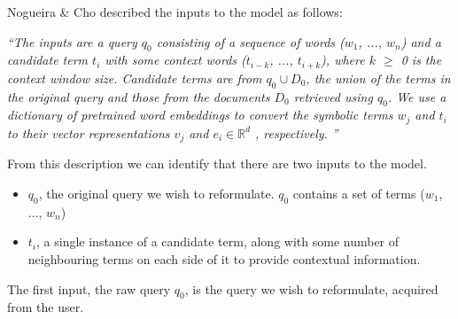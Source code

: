 Nogueira \& Cho \cite{nogueira2017task} described the inputs to the model as follows: \newline

\textit{``The inputs are a query $q_0$ consisting of a sequence
of words ($w_1$, ..., $w_n$) and a candidate term
$t_i$ with some context words ($t_{i-k}$, ..., $t_{i+k}$), where
$k$ $\geq$ 0 is the context window size. Candidate terms are from $q_0 \cup D_0$, the union of the terms in the original query and those from the documents $D_0$ retrieved using $q_0$. We use a dictionary of pretrained word embeddings to convert the symbolic terms $w_j$ and $t_i$ to their vector representations $v_j$ and $e_i \in \mathbb{R}^{d}$ , respectively.
''} \newline

From this description we can identify that there are two inputs to the model.

\begin{itemize}
\item $q_0$, the original query we wish to reformulate. $q_0$ contains a set of terms ($w_1$, ..., $w_n$)	
\item $t_i$, a single instance of a candidate term, along with some number of neighbouring terms on each side of it to provide contextual information.
\end{itemize}



The first input, the raw query  $q_0$, is the query we wish to reformulate, acquired from the user. 

